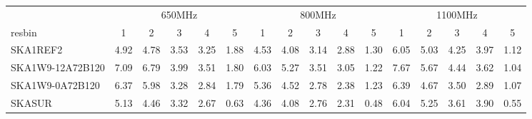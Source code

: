 \begin{table}[!htp]
{{\begin{tabular}{|lccccc||ccccc||ccccc|}
 \tabularnewline \cline{2-16} \multicolumn{1}{c}{ } & \multicolumn{5}{|c}{650MHz}  & \multicolumn{5}{c}{800MHz}  & \multicolumn{5}{c|}{1100MHz} \tabularnewline \cline{1-16} 
 resbin  &1 & 2 & 3 & 4 & 5 & 1 & 2 & 3 & 4 & 5 & 1 & 2 & 3 & 4 & 5 \tabularnewline \hline
SKA1REF2 & 4.92 \cellcolor{blue!18.00} & 4.78 \cellcolor{red!23.77} & 3.53 \cellcolor{green!32.79} & 3.25 \cellcolor{orange!47.00} & 1.88 \cellcolor{purple!60.00} & 4.53 \cellcolor{blue!22.28} & 4.08 \cellcolor{red!18.00} & 3.14 \cellcolor{green!39.28} & 2.88 \cellcolor{orange!50.35} & 1.30 \cellcolor{purple!60.00} & 6.05 \cellcolor{blue!18.26} & 5.03 \cellcolor{red!33.12} & 4.25 \cellcolor{green!51.51} & 3.97 \cellcolor{orange!60.00} & 1.12 \cellcolor{purple!60.00}\\ \hline 
SKA1W9-12A72B120 & 7.09 \cellcolor{blue!60.00} & 6.79 \cellcolor{red!60.00} & 3.99 \cellcolor{green!60.00} & 3.51 \cellcolor{orange!60.00} & 1.80 \cellcolor{purple!57.31} & 6.03 \cellcolor{blue!60.00} & 5.27 \cellcolor{red!60.00} & 3.51 \cellcolor{green!60.00} & 3.05 \cellcolor{orange!60.00} & 1.22 \cellcolor{purple!55.90} & 7.67 \cellcolor{blue!60.00} & 5.67 \cellcolor{red!60.00} & 4.44 \cellcolor{green!60.00} & 3.62 \cellcolor{orange!46.39} & 1.04 \cellcolor{purple!54.11}\\ \hline 
SKA1W9-0A72B120 & 6.37 \cellcolor{blue!46.06} & 5.98 \cellcolor{red!45.40} & 3.28 \cellcolor{green!18.00} & 2.84 \cellcolor{orange!26.50} & 1.79 \cellcolor{purple!56.98} & 5.36 \cellcolor{blue!43.15} & 4.52 \cellcolor{red!33.53} & 2.78 \cellcolor{green!19.12} & 2.38 \cellcolor{orange!21.97} & 1.23 \cellcolor{purple!56.41} & 6.39 \cellcolor{blue!27.02} & 4.67 \cellcolor{red!18.00} & 3.50 \cellcolor{green!18.00} & 2.89 \cellcolor{orange!18.00} & 1.07 \cellcolor{purple!56.32}\\ \hline 
SKASUR & 5.13 \cellcolor{blue!22.06} & 4.46 \cellcolor{red!18.00} & 3.32 \cellcolor{green!20.37} & 2.67 \cellcolor{orange!18.00} & 0.63 \cellcolor{purple!18.00} & 4.36 \cellcolor{blue!18.00} & 4.08 \cellcolor{red!18.00} & 2.76 \cellcolor{green!18.00} & 2.31 \cellcolor{orange!18.00} & 0.48 \cellcolor{purple!18.00} & 6.04 \cellcolor{blue!18.00} & 5.25 \cellcolor{red!42.36} & 3.61 \cellcolor{green!22.91} & 3.90 \cellcolor{orange!57.28} & 0.55 \cellcolor{purple!18.00}\tabularnewline \hline 
\end{tabular}}\hfil 
{}}
\end{table}
